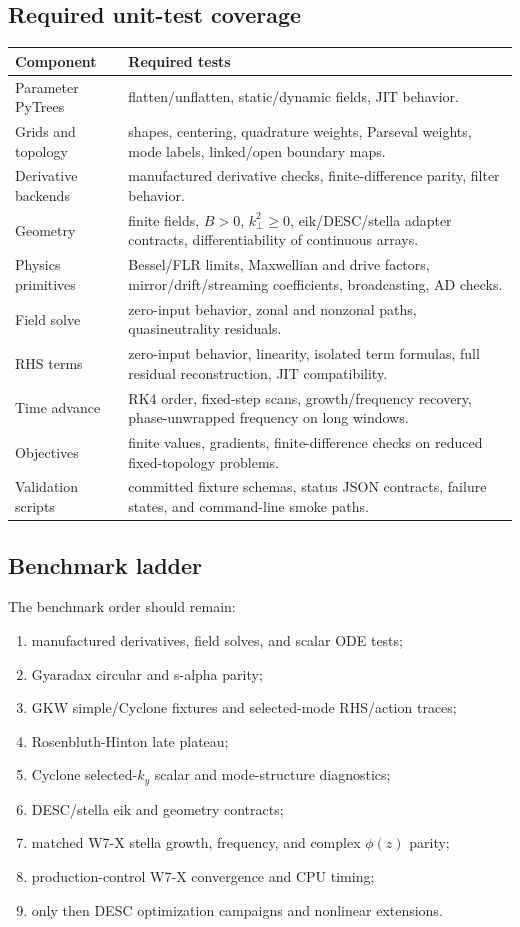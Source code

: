 \documentclass[11pt,a4paper]{article}
\begin{document}
\subsection{Required unit-test coverage}

\begin{longtable}{p{}p{}}
\toprule
Component & Required tests \\
\midrule
Parameter PyTrees & flatten/unflatten, static/dynamic fields, JIT behavior. \\
Grids and topology & shapes, centering, quadrature weights, Parseval weights, mode labels, linked/open boundary maps. \\
Derivative backends & manufactured derivative checks, finite-difference parity, filter behavior. \\
Geometry & finite fields, \(B>0\), \(k_\perp^2\ge0\), eik/DESC/stella adapter contracts, differentiability of continuous arrays. \\
Physics primitives & Bessel/FLR limits, Maxwellian and drive factors, mirror/drift/streaming coefficients, broadcasting, AD checks. \\
Field solve & zero-input behavior, zonal and nonzonal paths, quasineutrality residuals. \\
RHS terms & zero-input behavior, linearity, isolated term formulas, full residual reconstruction, JIT compatibility. \\
Time advance & RK4 order, fixed-step scans, growth/frequency recovery, phase-unwrapped frequency on long windows. \\
Objectives & finite values, gradients, finite-difference checks on reduced fixed-topology problems. \\
Validation scripts & committed fixture schemas, status JSON contracts, failure states, and command-line smoke paths. \\
\bottomrule
\end{longtable}

\subsection{Benchmark ladder}

The benchmark order should remain:
\begin{enumerate}
  \item manufactured derivatives, field solves, and scalar ODE tests;
  \item Gyaradax circular and s-alpha parity;
  \item GKW simple/Cyclone fixtures and selected-mode RHS/action traces;
  \item Rosenbluth-Hinton late plateau;
  \item Cyclone selected-\(k_y\) scalar and mode-structure diagnostics;
  \item DESC/stella eik and geometry contracts;
  \item matched W7-X stella growth, frequency, and complex \(\phi(z)\) parity;
  \item production-control W7-X convergence and CPU timing;
  \item only then DESC optimization campaigns and nonlinear extensions.
\end{enumerate}
\end{document}
